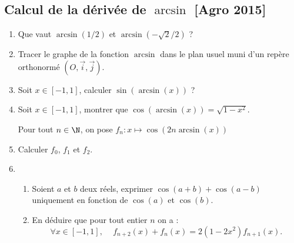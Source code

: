 \subsection{Calcul de la dérivée de $\arcsin$ [Agro 2015]}


\begin{exercice}
\begin{enumerate}
\item Que vaut $\arcsin(1/2)$ et $\arcsin(-\sqrt{2}/2)$ ?
\item Tracer le graphe de la fonction $\arcsin$ dans le plan usuel muni d'un repère orthonormé $(O, \vec{i}, \vec{j})$.
\item Soit $x\in [-1, 1]$, calculer  $\sin(\arcsin(x))$ ?
\item Soit $x\in [-1, 1]$, montrer que  $\cos(\arcsin(x)) = \sqrt{1-x^2}$.

 Pour tout $n\in \N$, on pose $f_n  : x\mapsto \cos(2n \arcsin(x))$ 
\item Calculer $f_0$, $f_1$ et $f_2$. 
\item \begin{enumerate}
\item Soient $a$ et $b$ deux réels, exprimer $\cos(a+b) +\cos(a-b)$ uniquement en fonction de $\cos(a)$ et $\cos(b)$. 
\item En déduire que pour tout entier $n$ on  a :
$$\forall x \in [-1, 1], \, \quad f_{n+2}(x) + f_n(x) =2(1-2x^2) f_{n+1}(x).$$
\end{enumerate}
\end{enumerate}


\end{exercice}

